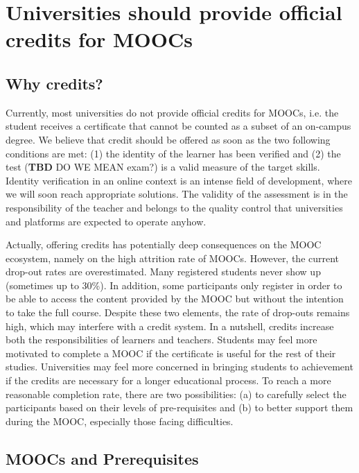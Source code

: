 \section{Universities should provide official credits for MOOCs}
 
\subsection{Why credits?}

Currently, most universities do not provide official credits for MOOCs,
i.e. the student receives a certificate that cannot be counted as a
subset of an on-campus degree. We believe that credit should be offered
as soon as the two following conditions are met: (1) the identity of the
learner has been verified and (2) the test (\textbf{TBD} DO WE MEAN exam?) is a valid
measure of the target skills. Identity verification in an online context
is an intense field of development, where we will soon reach appropriate
solutions. The validity of the assessment is in the responsibility of
the teacher and belongs to the quality control that universities and
platforms are expected to operate anyhow.

Actually, offering credits has potentially deep consequences on the MOOC
ecosystem, namely on the high attrition rate of MOOCs. However, the
current drop-out rates are overestimated. Many registered students never
show up (sometimes up to 30\%). In addition, some participants only
register in order to be able to access the content provided by the MOOC
but without the intention to take the full course. Despite these two
elements, the rate of drop-outs remains high, which may interfere with a
credit system. In a nutshell, credits increase both the responsibilities
of learners and teachers. Students may feel more motivated to complete a
MOOC if the certificate is useful for the rest of their
studies. Universities may feel more concerned in bringing students to
achievement if the credits are necessary for a longer educational
process.  To reach a more reasonable completion rate, there are two
possibilities: (a) to carefully select the participants based on their
levels of pre-requisites and (b) to better support them during the MOOC,
especially those facing difficulties.


\subsection{MOOCs and Prerequisites}

